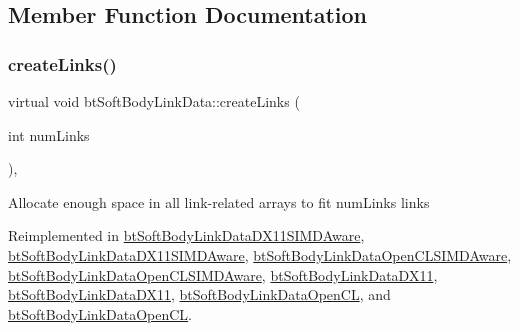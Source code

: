 \subsection{Member Function Documentation}
\mbox{\label{classbtSoftBodyLinkData_a1713d14604037ca88d7915d627a32a13}} 
\subsubsection{\texorpdfstring{create\+Links()}{createLinks()}\hspace{0.1cm}{\footnotesize\ttfamily [1/2]}}
{\footnotesize\ttfamily virtual void bt\+Soft\+Body\+Link\+Data\+::create\+Links (\begin{DoxyParamCaption}\item[{int}]{num\+Links }\end{DoxyParamCaption})\hspace{0.3cm}{\ttfamily [inline]}, {\ttfamily [virtual]}}

Allocate enough space in all link-\/related arrays to fit num\+Links links 

Reimplemented in \hyperlink{classbtSoftBodyLinkDataDX11SIMDAware_a8b3760b7e8393ad2ff03be02c8b91854}{bt\+Soft\+Body\+Link\+Data\+D\+X11\+S\+I\+M\+D\+Aware}, \hyperlink{classbtSoftBodyLinkDataDX11SIMDAware_ab8d378a7cbe3425a7fc56e133b678b8e}{bt\+Soft\+Body\+Link\+Data\+D\+X11\+S\+I\+M\+D\+Aware}, \hyperlink{classbtSoftBodyLinkDataOpenCLSIMDAware_a43ee8b9067c214c87e073057a63071ba}{bt\+Soft\+Body\+Link\+Data\+Open\+C\+L\+S\+I\+M\+D\+Aware}, \hyperlink{classbtSoftBodyLinkDataOpenCLSIMDAware_afa62243874cf252299a3dd17eb6502c1}{bt\+Soft\+Body\+Link\+Data\+Open\+C\+L\+S\+I\+M\+D\+Aware}, \hyperlink{classbtSoftBodyLinkDataDX11_a5844647a05674cc45bf99b658ba1804a}{bt\+Soft\+Body\+Link\+Data\+D\+X11}, \hyperlink{classbtSoftBodyLinkDataDX11_afe887ef6ecba2a73287f1b3260a0f3e4}{bt\+Soft\+Body\+Link\+Data\+D\+X11}, \hyperlink{classbtSoftBodyLinkDataOpenCL_a3ebb411d58ecebab84e391588f20204f}{bt\+Soft\+Body\+Link\+Data\+Open\+CL}, and \hyperlink{classbtSoftBodyLinkDataOpenCL_acc44e1a0b702ca17a5185d39e47f9b05}{bt\+Soft\+Body\+Link\+Data\+Open\+CL}.

\mbox{\label{classbtSoftBodyLinkData_a1713d14604037ca88d7915d627a32a13}} 
